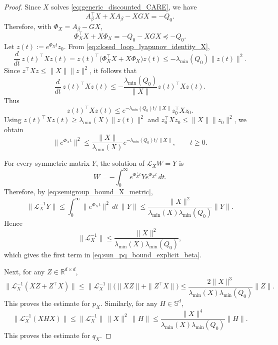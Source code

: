 \documentclass[a4paper, 10pt, english, reqno]{amsart}
\begin{document}
    \begin{proof}
    Since $X$ solves \eqref{eq:generic_discounted_CARE}, we have
    \[
        A_\beta^\top X+XA_\beta-XGX=-Q_0.
    \]
    Therefore, with $\Phi_X=A_\beta-GX$,
    \begin{equation}
    \label{eq:closed_loop_lyapunov_identity_X}
        \Phi_X^\top X+X\Phi_X
        =
        -Q_0-XGX
        \preceq
        -Q_0.
    \end{equation}
    Let $z(t):=e^{\Phi_Xt}z_0$. From
    \eqref{eq:closed_loop_lyapunov_identity_X},
    \[
        \frac{d}{dt}\,z(t)^\top Xz(t)
        =
        z(t)^\top
        \bigl(\Phi_X^\top X+X\Phi_X\bigr)
        z(t)
        \le
        -\lambda_{\min}(Q_0)\|z(t)\|^2.
    \]
    Since $z^\top Xz\le \|X\|\|z\|^2$, it follows that
    \[
        \frac{d}{dt}\,z(t)^\top Xz(t)
        \le
        -
        \frac{\lambda_{\min}(Q_0)}{\|X\|}
        z(t)^\top Xz(t).
    \]
    Thus
    \[
        z(t)^\top Xz(t)
        \le
        e^{-\lambda_{\min}(Q_0)t/\|X\|}
        z_0^\top Xz_0.
    \]
    Using $z(t)^\top Xz(t)\ge\lambda_{\min}(X)\|z(t)\|^2$ and
    $z_0^\top Xz_0\le \|X\|\|z_0\|^2$, we obtain
    \begin{equation}
    \label{eq:semigroup_bound_X_metric}
        \|e^{\Phi_Xt}\|^2
        \le
        \frac{\|X\|}{\lambda_{\min}(X)}
        e^{-\lambda_{\min}(Q_0)t/\|X\|},
        \qquad t\ge0.
    \end{equation}
    
    For every symmetric matrix $Y$, the solution of
    $\mathcal L_XW=Y$ is
    \[
        W
        =
        -\int_0^\infty
        e^{\Phi_X^\top t}
        Y
        e^{\Phi_Xt}\,dt.
    \]
    Therefore, by \eqref{eq:semigroup_bound_X_metric},
    \[
        \|\mathcal L_X^{-1}Y\|
        \le
        \int_0^\infty
        \|e^{\Phi_Xt}\|^2\,dt\,\|Y\|
        \le
        \frac{\|X\|^2}
        {\lambda_{\min}(X)\lambda_{\min}(Q_0)}
        \|Y\|.
    \]
    Hence
    \[
        \|\mathcal L_X^{-1}\|
        \le
        \frac{\|X\|^2}
        {\lambda_{\min}(X)\lambda_{\min}(Q_0)},
    \]
    which gives the first term in \eqref{eq:sun_pq_bound_explicit_beta}.
    
    Next, for any $Z\in\mathbb R^{d\times d}$,
    \[
        \|\mathcal L_X^{-1}(XZ+Z^\top X)\|
        \le
        \|\mathcal L_X^{-1}\|
        \bigl(\|XZ\|+\|Z^\top X\|\bigr)
        \le
        \frac{2\|X\|^3}
        {\lambda_{\min}(X)\lambda_{\min}(Q_0)}
        \|Z\|.
    \]
    This proves the estimate for $p_X$. Similarly, for any
    $H\in\mathbb S^d$,
    \[
        \|\mathcal L_X^{-1}(XHX)\|
        \le
        \|\mathcal L_X^{-1}\|\,\|X\|^2\,\|H\|
        \le
        \frac{\|X\|^4}
        {\lambda_{\min}(X)\lambda_{\min}(Q_0)}
        \|H\|.
    \]
    This proves the estimate for $q_X$.
    

\end{proof}
\end{document}
